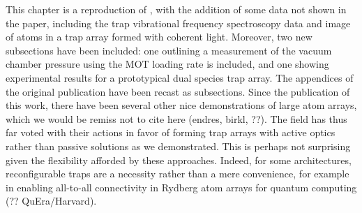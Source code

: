 

This chapter is a reproduction of \cite{PHuft2022}, with the addition of some data not shown in the paper, including the trap vibrational frequency spectroscopy data and image of atoms in a trap array formed with coherent light. Moreover, two new subsections have been included: one outlining a measurement of the vacuum chamber pressure using the MOT loading rate is included, and one showing experimental results for a prototypical dual species trap array. The appendices of the original publication have been recast as subsections. Since the publication of this work, there have been several other nice demonstrations of large atom arrays, which we would be remiss not to cite here (endres, birkl, ??). The field has thus far voted with their actions in favor of forming trap arrays with active optics rather than passive solutions as we demonstrated. This is perhaps not surprising given the flexibility afforded by these approaches. Indeed, for some architectures, reconfigurable traps are a necessity rather than a mere convenience, for example in enabling all-to-all connectivity in Rydberg atom arrays for quantum computing (?? QuEra/Harvard).


